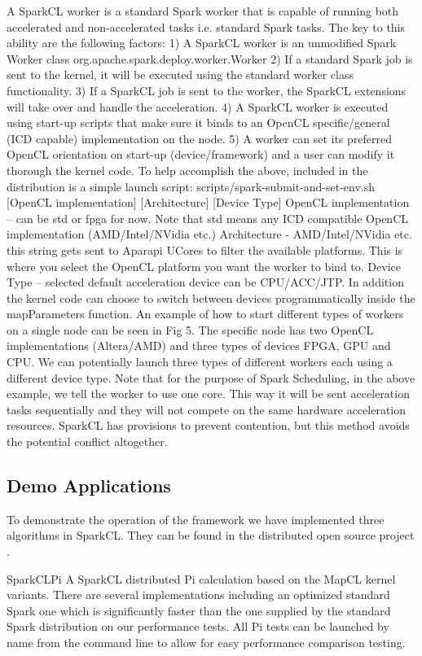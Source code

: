 \documentclass[runningheads,a4paper]{llncs}
\begin{document}
A SparkCL worker is a standard Spark worker that is capable of running both accelerated and non-accelerated tasks i.e. standard Spark tasks. The key to this ability are the following factors:
1) A SparkCL worker is an unmodified Spark Worker class org.apache.spark.deploy.worker.Worker
2) If a standard Spark job is sent to the kernel, it will be executed using the standard worker class functionality.
3) If a SparkCL job is sent to the worker, the SparkCL extensions will take over and handle the acceleration.
4) A SparkCL worker is executed using start-up scripts that make sure it binds to an OpenCL specific/general (ICD capable) implementation on the node.
5) A worker can set its preferred OpenCL orientation on start-up (device/framework) and a user can modify it thorough the kernel code.
To help accomplish the above, included in the distribution is a simple launch script:
scripts/spark-submit-and-set-env.sh [OpenCL implementation] [Architecture] [Device Type]
OpenCL implementation – can be std or fpga for now. Note that std means any ICD compatible OpenCL implementation (AMD/Intel/NVidia etc.)
Architecture - AMD/Intel/NVidia etc. this string gets sent to Aparapi UCores to filter the available platforms. This is where you select the OpenCL platform you want the worker to bind to.
Device Type – selected default acceleration device can be CPU/ACC/JTP. In addition the kernel code can choose to switch between devices programmatically inside the mapParameters function.
An example of how to start different types of workers on a single node can be seen in Fig 5. The specific node has two OpenCL implementations (Altera/AMD) and three types of devices FPGA, GPU and CPU. We can potentially launch three types of different workers each using a different device type. Note that for the purpose of Spark Scheduling, in the above example, we tell the worker to use one core. This way it will be sent acceleration tasks sequentially and they will not compete on the same hardware acceleration resources. SparkCL has provisions to prevent contention, but this method avoids the potential conflict altogether.

\subsection{Demo Applications}
To demonstrate the operation of the framework we have implemented three algorithms in SparkCL. They can be found in the distributed open source project \cite{SparkCL:2015}.

SparkCLPi
A SparkCL distributed Pi calculation based on the MapCL kernel variants. There are several implementations including an optimized standard Spark one which is significantly faster than the one supplied by the standard Spark distribution on our performance tests. All Pi tests can be launched by name from the command line to allow for easy performance comparison testing.
\end{document}
